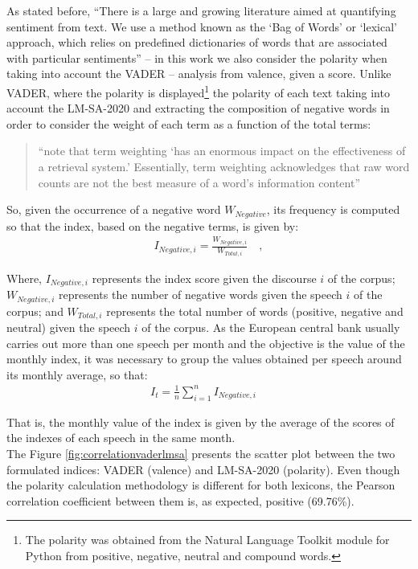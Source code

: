 As stated before, ``There is a large and growing literature aimed at quantifying sentiment from text. We use a method known as the `Bag of Words' or `lexical' approach, which relies on predefined dictionaries of words that are associated with particular sentiments'' \cite[p. 13]{shapiro2021taking} -- in this work we also consider the polarity when taking into account the VADER -- analysis from valence, given a score. Unlike VADER, where the polarity is displayed\footnote{The polarity was obtained from the Natural Language Toolkit \cite[]{bird2009natural} module for Python from positive, negative, neutral and compound words.} the polarity of each text taking into account the LM-SA-2020 and extracting the composition of negative words in order to consider the weight of each term as a function of the total terms:

\begin{quote}
``note that term weighting `has an enormous impact on the effectiveness of a retrieval system.' Essentially, term weighting acknowledges that raw word counts are not the
best measure of a word’s information content''\cite[p. 42]{shapiro2020measuring}
\end{quote}

So, given the occurrence of a negative word $W_{Negative}$, its frequency is computed so that the index, based on the negative terms, is given by:
\begin{align*}
I_{Negative, i} = \frac{W_{Negative, i}}{W_{Total, i}} \quad ,
\end{align*}

Where, $I_{Negative, i}$ represents the index score given the discourse $i$ of the corpus; $W_{Negative, i}$ represents the number of negative words given the speech $i$ of the corpus; and $W_{Total, i}$ represents the total number of words (positive, negative and neutral) given the speech $i$ of the corpus. As the European central bank usually carries out more than one speech per month and the objective is the value of the monthly index, it was necessary to group the values obtained per speech around its monthly average, so that:
\begin{align*}
    I_{t} = \frac{1}{n}\sum_{i=1}^{n}I_{Negative,i} \quad
\end{align*}

That is, the monthly value of the index is given by the average of the scores of the indexes of each speech in the same month.\\

The Figure \ref{fig:correlationvaderlmsa} presents the scatter plot between the two formulated indices: VADER (valence) and LM-SA-2020 (polarity). Even though the polarity calculation methodology is different for both lexicons, the Pearson correlation coefficient between them is, as expected, positive (69.76\%).

